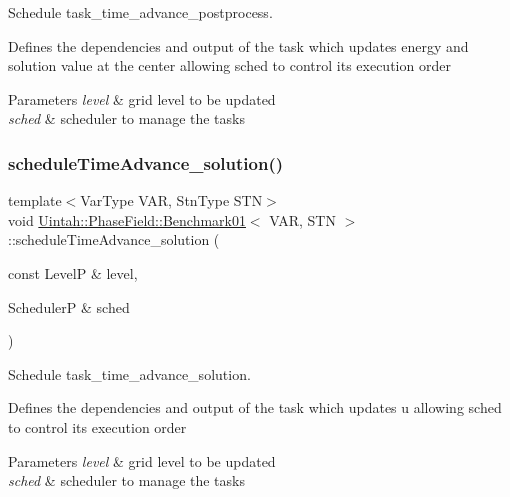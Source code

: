 Schedule task\+\_\+time\+\_\+advance\+\_\+postprocess. 

Defines the dependencies and output of the task which updates energy and solution value at the center allowing sched to control its execution order


\begin{DoxyParams}{Parameters}
{\em level} & grid level to be updated \\
\hline
{\em sched} & scheduler to manage the tasks \\
\hline
\end{DoxyParams}
\mbox{\label{classUintah_1_1PhaseField_1_1Benchmark01_a2cf1fec2489115edcb7935be78a79e2a}} 
\subsubsection{\texorpdfstring{schedule\+Time\+Advance\+\_\+solution()}{scheduleTimeAdvance\_solution()}}
{\footnotesize\ttfamily template$<$Var\+Type V\+AR, Stn\+Type S\+TN$>$ \\
void \hyperlink{classUintah_1_1PhaseField_1_1Benchmark01}{Uintah\+::\+Phase\+Field\+::\+Benchmark01}$<$ V\+AR, S\+TN $>$\+::schedule\+Time\+Advance\+\_\+solution (\begin{DoxyParamCaption}\item[{const LevelP \&}]{level,  }\item[{SchedulerP \&}]{sched }\end{DoxyParamCaption})\hspace{0.3cm}{\ttfamily [protected]}}



Schedule task\+\_\+time\+\_\+advance\+\_\+solution. 

Defines the dependencies and output of the task which updates u allowing sched to control its execution order


\begin{DoxyParams}{Parameters}
{\em level} & grid level to be updated \\
\hline
{\em sched} & scheduler to manage the tasks \\
\hline
\end{DoxyParams}
\mbox{\label{classUintah_1_1PhaseField_1_1Benchmark01_aae2f068c2c47ba30085ab056c017eee3}} 
